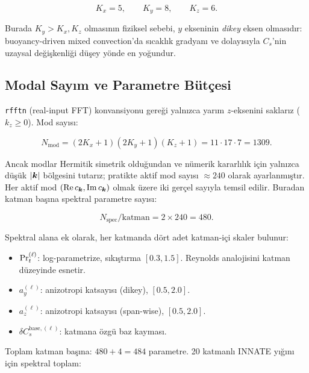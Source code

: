 \begin{equation}
  K_x = 5,\qquad K_y = 8,\qquad K_z = 6.
  \label{eq:truncation}
\end{equation}

Burada $K_y > K_x, K_z$ olmasının fiziksel sebebi, $y$ ekseninin
\emph{dikey} eksen olmasıdır: buoyancy-driven mixed convection'da
sıcaklık gradyanı ve dolayısıyla $C_s$'nin uzaysal değişkenliği
düşey yönde en yoğundur.

\subsection{Modal Sayım ve Parametre Bütçesi}

\texttt{rfftn} (real-input FFT) konvansiyonu gereği yalnızca yarım
$z$-eksenini saklarız ($k_z\geq 0$). Mod sayısı:

\begin{equation}
  N_{\mathrm{mod}} = (2K_x+1)(2K_y+1)(K_z+1) = 11\cdot 17\cdot 7 = 1309.
\end{equation}

Ancak modlar Hermitik simetrik olduğundan ve nümerik kararlılık için
yalnızca düşük $|\bm{k}|$ bölgesini tutarız; pratikte aktif mod
sayısı $\approx 240$ olarak ayarlanmıştır. Her aktif mod $(\mathrm{Re}\,c_{\bm{k}},
\mathrm{Im}\,c_{\bm{k}})$ olmak üzere iki gerçel sayıyla temsil edilir.
Buradan katman başına spektral parametre sayısı:

\begin{equation}
  N_{\mathrm{spec}}/\text{katman} = 2 \times 240 = 480.
\end{equation}

Spektral alana ek olarak, her katmanda dört adet katman-içi skaler bulunur:

\begin{itemize}
  \item $\mathrm{Pr}_t^{(\ell)}$: log-parametrize, sıkıştırma $[0.3, 1.5]$.
        Reynolds analojisini katman düzeyinde esnetir.
  \item $a_y^{(\ell)}$: anizotropi katsayısı (dikey), $[0.5, 2.0]$.
  \item $a_z^{(\ell)}$: anizotropi katsayısı (span-wise), $[0.5, 2.0]$.
  \item $\delta C_s^{\mathrm{base},(\ell)}$: katmana özgü baz kayması.
\end{itemize}

Toplam katman başına: $480 + 4 = 484$ parametre. 20 katmanlı INNATE
yığını için spektral toplam:

